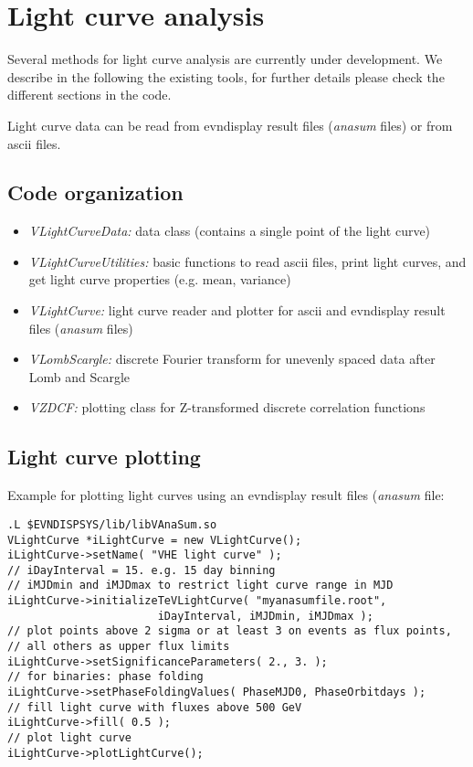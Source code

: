 \documentclass[titlepage,a4paper,twoside,11pt]{report}
\begin{document}

\chapter{Light curve analysis}

Several methods for light curve analysis are currently under development. We describe in the following the existing tools, for further details please check the different sections in the code.

Light curve data can be read from evndisplay result files ({\it anasum} files) or from ascii files.

\section{Code organization}

\begin{itemize}
\item {\it VLightCurveData:} data class (contains a single point of the light curve)
\item {\it VLightCurveUtilities:} basic functions to read ascii files, print light curves, and get light curve properties (e.g. mean, variance)
\item {\it VLightCurve:} light curve reader and plotter for ascii and evndisplay result files ({\it anasum} files)
\item {\it  VLombScargle:} discrete Fourier transform for unevenly spaced data  after Lomb and Scargle
\item {\it VZDCF:} plotting class for Z-transformed discrete correlation functions
\end{itemize}

\section{Light curve plotting}

Example for plotting light curves using an evndisplay result files ({\it anasum} file:

\begin{lstlisting}
.L $EVNDISPSYS/lib/libVAnaSum.so 
VLightCurve *iLightCurve = new VLightCurve();
iLightCurve->setName( "VHE light curve" );
// iDayInterval = 15. e.g. 15 day binning
// iMJDmin and iMJDmax to restrict light curve range in MJD
iLightCurve->initializeTeVLightCurve( "myanasumfile.root", 
                       iDayInterval, iMJDmin, iMJDmax );
// plot points above 2 sigma or at least 3 on events as flux points, 
// all others as upper flux limits
iLightCurve->setSignificanceParameters( 2., 3. );
// for binaries: phase folding
iLightCurve->setPhaseFoldingValues( PhaseMJD0, PhaseOrbitdays );
// fill light curve with fluxes above 500 GeV
iLightCurve->fill( 0.5 );
// plot light curve
iLightCurve->plotLightCurve();
\end{lstlisting}
\end{document}

